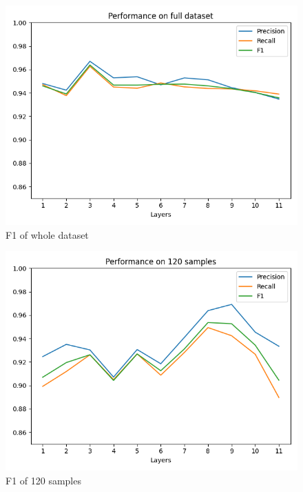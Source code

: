 \documentclass[11pt,a4paper]{article}
\begin{document}
\begin{figure}
\begin{center}
  \includegraphics[width=\linewidth]{f1-full.png}
  \caption{\label{fig:f1-full}F1 of whole dataset}
\end{center}
\end{figure}
\begin{figure}
\begin{center}
  \includegraphics[width=\linewidth]{f1-120.png}
  \caption{\label{fig:f1-120}F1 of 120 samples}
\end{center}
\end{figure}
\end{document}
